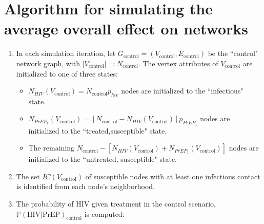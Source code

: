 \documentclass{article}
\theoremstyle{definition}
\begin{document}
\section{\textbf{Algorithm for simulating the average overall effect on networks}}
\label{Appendix 3}

    \begin{enumerate}
\item In each simulation iteration, let $G_{\text{control}}=\left(V_{\text{control}},E_{\text{control}}\right)$ be the ``control" network graph, with $\vert V_{\text{control}}\vert \eqqcolon N_{\text{control}}$. The vertex attributes of $V_{\text{control}}$ are initialized to one of three states: 
\begin{itemize}
        \item  $N_{HIV}(V_{\text{control}})=N_{\text{control}}p_{hiv}$ nodes are initialized to the  ``infectious" state.
        \item $N_{PrEP_{1}}\left(V_{\text{control}}\right)=\left[N_{\text{control}}-N_{HIV}\left(V_{\text{control}}\right)\right]p_{PrEP_{1}}$ nodes are initialized to the ``treated,susceptible" state. 
        \item The remaining $N_{\text{control}}-\left[N_{HIV}\left(V_{\text{control}}\right)+N_{PrEP_{1}}\left(V_{\text{control}}\right)\right]$ nodes are initialized to the ``untreated, susceptible" state.
    \end{itemize}
    \item The set $IC(V_{\text{control}})$ of susceptible nodes with at least one infectious contact is identified from each node's neighborhood.
    \item The probability of HIV given treatment in the control scenario, $\mathbb{P}(\text{HIV} \vert \text{PrEP})_{\text{control}}$ is computed:
    \begin{enumerate}
     

\end{enumerate}
\end{enumerate}
\end{document}
